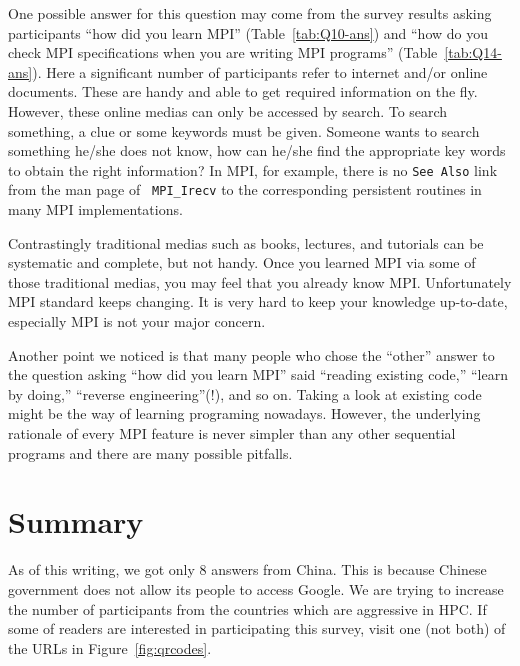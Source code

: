 \documentclass[sigconf,nonacm]{acmart}
\begin{document}
One possible answer for this question may come from the survey results
asking participants ``how did you learn MPI''
(Table~\ref{tab:Q10-ans}) and ``how do you check
MPI specifications when you are writing MPI programs''
(Table~\ref{tab:Q14-ans}). 
Here a significant number of participants refer to internet
and/or online documents. These are handy and able to get required
information on the fly. However, 
these online medias can only be accessed by
search. To search something, a clue or some keywords must be given. 
Someone wants to search something he/she does not know, how can he/she
find the appropriate key words to obtain the right information? In
MPI, for example, there is no {\tt See Also} link from the man page of {\tt
  MPI\_Irecv}  to the corresponding persistent routines in many MPI
implementations. 

Contrastingly traditional medias such as books, lectures, and tutorials can be
systematic and complete, but not handy.  Once you learned MPI via some
of those traditional medias, you may feel that you already know
MPI. Unfortunately MPI standard keeps changing. It is very hard to
keep your knowledge up-to-date, especially MPI is not your major
concern. 

Another point we noticed is that many people who chose the ``other''
answer to the question asking ``how did you learn MPI'' said
``reading existing code,'' ``learn by doing,'' ``reverse
engineering''(!),  and so on. Taking a look at existing code might be
the way of learning programing nowadays. However, the underlying
rationale of every MPI feature is never simpler than any other
sequential programs and there are many possible pitfalls. 


\section{Summary}

As of this writing, we got only 8 answers from China. This is because 
Chinese government does not allow its people to access Google. We are
trying to increase the number of participants from the
countries which are aggressive in HPC.  
If some of readers are interested in participating this survey, visit
one (not both) of the URLs in Figure~\ref{fig:qrcodes}.
\end{document}
